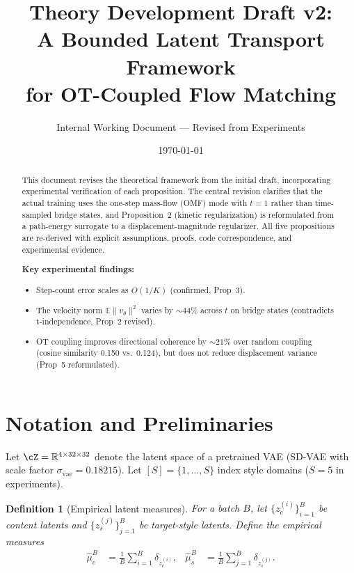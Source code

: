 \documentclass[letterpaper]{article}
\title{Theory Development Draft v2:\\A Bounded Latent Transport Framework\\for OT-Coupled Flow Matching}
\author{Internal Working Document — Revised from Experiments}
\date{\today}
\newtheorem{definition}[proposition]{Definition}
\newcommand{\R}{\mathbb{R}}
\newcommand{\E}{\mathbb{E}}
\begin{document}
\maketitle

\begin{abstract}
This document revises the theoretical framework from the initial draft,
incorporating experimental verification of each proposition.
The central revision clarifies that the actual training uses the one-step
mass-flow (OMF) mode with $t=1$ rather than time-sampled bridge states,
and Proposition~2 (kinetic regularization) is reformulated from a
path-energy surrogate to a displacement-magnitude regularizer.
All five propositions are re-derived with explicit assumptions, proofs,
code correspondence, and experimental evidence.

\textbf{Key experimental findings:}
\begin{itemize}[nosep]
    \item Step-count error scales as $O(1/K)$ (confirmed, Prop~3).
    \item The velocity norm $\E\|v_\theta\|^2$ varies by $\sim 44\%$ across
    $t$ on bridge states (contradicts t-independence, Prop~2 revised).
    \item OT coupling improves directional coherence by $\sim 21\%$ over
    random coupling (cosine similarity 0.150 vs.~0.124), but does not reduce
    displacement variance (Prop~5 reformulated).
\end{itemize}
\end{abstract}

\tableofcontents

\newpage

\section{Notation and Preliminaries}

Let $\cZ = \R^{4 \times 32 \times 32}$ denote the latent space of a pretrained
VAE (SD-VAE with scale factor $\sigma_{\text{vae}}=0.18215$).
Let $[S] = \{1,\dots,S\}$ index style domains ($S=5$ in experiments).

\begin{definition}[Empirical latent measures]
For a batch $B$, let $\{z_c^{(i)}\}_{i=1}^B$ be content latents and
$\{z_s^{(j)}\}_{j=1}^B$ be target-style latents. Define the empirical measures
\begin{align}
    \hat\mu_c^B &= \frac{1}{B}\sum_{i=1}^B \delta_{z_c^{(i)}},
    &
    \hat\mu_s^B &= \frac{1}{B}\sum_{j=1}^B \delta_{z_s^{(j)}}.
\end{align}
\end{definition}
\end{document}
